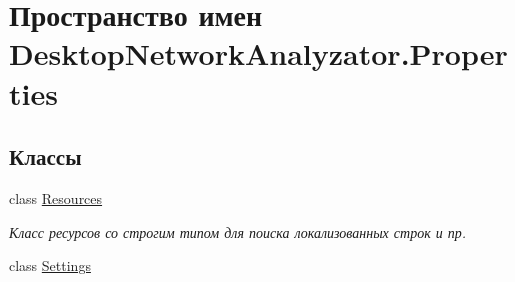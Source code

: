 \hypertarget{namespace_desktop_network_analyzator_1_1_properties}{}\section{Пространство имен Desktop\+Network\+Analyzator.\+Properties}
\label{namespace_desktop_network_analyzator_1_1_properties}
\subsection*{Классы}
\begin{DoxyCompactItemize}
\item 
class \hyperlink{class_desktop_network_analyzator_1_1_properties_1_1_resources}{Resources}
\begin{DoxyCompactList}\small\item\em Класс ресурсов со строгим типом для поиска локализованных строк и пр. \end{DoxyCompactList}\item 
class \hyperlink{class_desktop_network_analyzator_1_1_properties_1_1_settings}{Settings}
\end{DoxyCompactItemize}
